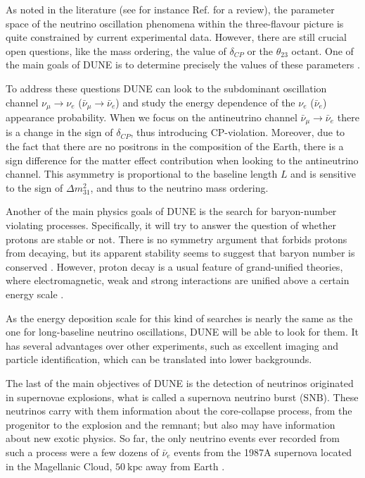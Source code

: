 As noted in the literature (see for instance Ref. \cite{deSalas2020} for a review), the parameter space of the neutrino oscillation phenomena within the three-flavour picture is quite constrained by current experimental data. However, there are still crucial open questions, like the mass ordering, the value of $\delta_{CP}$ or the $\theta_{23}$ octant. One of the main goals of DUNE is to determine precisely the values of these parameters \cite{DUNE2020TDR2}.

To address these questions DUNE can look to the subdominant oscillation channel $\nu_{\mu} \rightarrow \nu_{e}$ ($\bar{\nu}_{\mu} \rightarrow \bar{\nu}_{e}$) and study the energy dependence of the $\nu_{e}$ ($\bar{\nu}_{e}$) appearance probability. When we focus on the antineutrino channel $\bar{\nu}_{\mu} \rightarrow \bar{\nu}_{e}$ there is a change in the sign of $\delta_{CP}$, thus introducing CP-violation. Moreover, due to the fact that there are no positrons in the composition of the Earth, there is a sign difference for the matter effect contribution when looking to the antineutrino channel. This asymmetry is proportional to the baseline length $L$ and is sensitive to the sign of $\Delta m^{2}_{31}$, and thus to the neutrino mass ordering.

Another of the main physics goals of DUNE is the search for baryon-number violating processes. Specifically, it will try to answer the question of whether protons are stable or not. There is no symmetry argument that forbids protons from decaying, but its apparent stability seems to suggest that baryon number is conserved \cite{Super-Kamiokande2009}. However, proton decay is a usual feature of grand-unified theories, where electromagnetic, weak and strong interactions are unified above a certain energy scale \cite{Raby2006}.

As the energy deposition scale for this kind of searches is nearly the same as the one for long-baseline neutrino oscillations, DUNE will be able to look for them. It has several advantages over other experiments, such as excellent imaging and particle identification, which can be translated into lower backgrounds.

The last of the main objectives of DUNE is the detection of neutrinos originated in supernovae explosions, what is called a supernova neutrino burst (SNB). These neutrinos carry with them information about the core-collapse process, from the progenitor to the explosion and the remnant; but also may have information about new exotic physics. So far, the only neutrino events ever recorded from such a process were a few dozens of $\bar{\nu}_{e}$ events from the 1987A supernova located in the Magellanic Cloud, $50~\mathrm{kpc}$ away from Earth \cite{Kamiokande-II1987, Bionta1987}.

